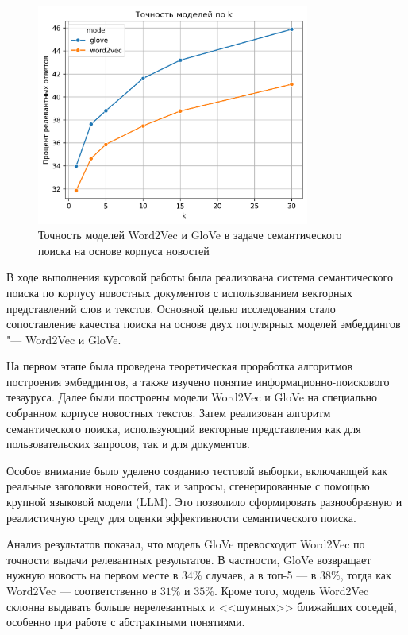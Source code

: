 \documentclass[coursework]{SCWorks}
\begin{document}
\begin{figure}[!ht]
    \centering
    \includegraphics[width=0.8\textwidth]{accuracy_by_model.png}
    \caption{Точность моделей Word2Vec и GloVe в задаче семантического поиска на основе корпуса новостей}
    \label{fig:search-analyse}
\end{figure}

\conclusion

В ходе выполнения курсовой работы была реализована система семантического поиска по корпусу новостных документов с использованием векторных представлений слов и текстов. Основной целью исследования стало сопоставление качества поиска на основе двух популярных моделей эмбеддингов "--- Word2Vec и GloVe.

На первом этапе была проведена теоретическая проработка алгоритмов построения эмбеддингов, а также изучено понятие информационно-поискового тезауруса. Далее были построены модели Word2Vec и GloVe на специально собранном корпусе новостных текстов. Затем реализован алгоритм семантического поиска, использующий векторные представления как для пользовательских запросов, так и для документов.

Особое внимание было уделено созданию тестовой выборки, включающей как реальные заголовки новостей, так и запросы, сгенерированные с помощью крупной языковой модели (LLM). Это позволило сформировать разнообразную и реалистичную среду для оценки эффективности семантического поиска.

Анализ результатов показал, что модель GloVe превосходит Word2Vec по точности выдачи релевантных результатов. В частности, GloVe возвращает нужную новость на первом месте в $34\%$ случаев, а в топ-5 — в $38\%$, тогда как Word2Vec — соответственно в $31\%$ и $35\%$. Кроме того, модель Word2Vec склонна выдавать больше нерелевантных и <<шумных>>  ближайших соседей, особенно при работе с абстрактными понятиями.
\end{document}
